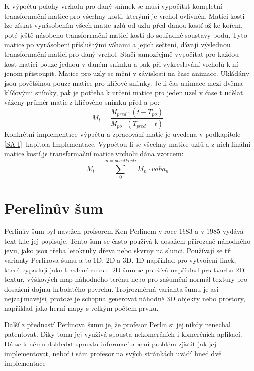K výpočtu polohy vrcholu pro daný snímek se musí vypočítat kompletní transformační matice pro všechny kosti, kterými je vrchol ovlivněn. Matici kosti lze získat vynásobením všech matic uzlů od uzlu před danou kostí až ke kořeni, poté ještě násobeno transformační maticí kosti do souřadné soustavy bodů. Tyto matice po vynásobení příslušnými váhami a jejich sečtení, dávají výslednou transformační matici pro daný vrchol. Stačí samozřejmě vypočítat pro každou kost matici pouze jednou v daném snímku a pak při vykreslování vrcholů k ní jenom přistoupit. Matice pro uzly se mění v závislosti na čase animace. Ukládány jsou povětšinou pouze matice pro klíčové snímky. Je-li čas animace mezi dvěma klíčovými snímky, pak je potřeba k určení matice pro jeden uzel v čase t udělat vážený průměr matic z klíčového snímku před a po:
\begin{equation}\label{SAprumer}
M_t = \frac{M_{pred} \cdot (t - T_{po})}{M_{po} \cdot (T_{pred} - t)}
\end{equation}
Konkrétní implementace výpočtu a zpracování matic je uvedena v podkapitole \ref{SA-I}, kapitola Implementace. Vypočtou-li se všechny matice uzlů a z nich finální matice kostí,je transformační matice vrcholu dána vzorcem:
\begin{equation}\label{SAvzorec}
M_t = \sum_{0}^{n = pocet kosti} M_n \cdot vaha_n
\end{equation}
  
\section{Perelinův šum}
Perlinův šum byl navržen profsorem Ken Perlinem v roce 1983 a v 1985 vydává text kde jej popisuje\cite{KP-old}. Tento šum se často používá k dosažení přirozeně náhodného jevu, jako jsou třeba letokruhy dřeva nebo skvrny na slunci. Používají se tři varianty Perlinova šumu a to 1D, 2D a 3D. 1D například pro vytvoření linek, které vypadají jako kreslené rukou. 2D šum se používá například pro tvorbu 2D textur, výškových map náhodného terénu nebo pro zašumění normál textury pro dosažení dojmu hrbolatého povrchu. Trojrozměrná varianta šumu je asi nejzajímavější, protože je schopna generovat náhodné 3D objekty nebo prostory, například jako herní mapy s velkým počtem prvků.

Další z předností Perlinova šumu je, že profesor Perlin si jej nikdy nenechal patentovat. Díky tomu jej využívá spousta nekomerčních i komerčních aplikací. Dá se k němu dohledat spousta informací a není problém zjistit jak jej implementovat, neboť i sám profesor na svých stránkách\cite{KP-site} uvádí hned dvě implementace. 


